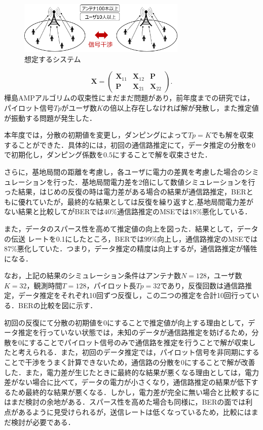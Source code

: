 \documentclass{jarticle}
\begin{document}
\begin{figure}[htbp]
    \begin{center}
     \includegraphics[width=80mm]{./system.png}
    \end{center}
    \caption{想定するシステム}
    \label{fig:system}
\end{figure}

\begin{equation} 
    \label{eq:SendSignal}
	\boldsymbol{X} =  \left(
		\begin{array}{cccc}
			\boldsymbol{X}_{11} &\boldsymbol{X}_{12} &\boldsymbol{P}\\
			\boldsymbol{P} &\boldsymbol{X}_{21} &\boldsymbol{X}_{22}
		\end{array}
	\right).
\end{equation}
樺島AMPアルゴリムの収束性にまだまだ問題があり，前年度までの研究では，パイロット信号$Tp$がユーザ数$K$の倍以上存在しなければ解が発散し，また推定値が振動する問題が発生した．

本年度では，分散の初期値を変更し，ダンピング\cite{vila}によって$Tp=K$でも解を収束することができた．具体的には，初回の通信路推定にて，データ推定の分散を0で初期化し，ダンピング係数を$0.5$にすることで解を収束させた．

さらに，基地局間の距離を考慮し，各ユーザに電力の差異を考慮した場合のシミュレーションを行った．基地局間電力差を2倍にして数値シミュレーションを行った結果，はじめの反復の時は電力差がある場合の結果が通信路推定，BERともに優れていたが，最終的な結果としては反復を繰り返すと,基地局間電力差がない結果と比較してがBERでは$40\%$通信路推定のMSEでは$18\%$悪化している．

また，データのスパース性を高めて推定値の向上を図った．結果として，データの伝送
レートを0.1にしたところ，BERでは$99\%$向上し，通信路推定のMSEでは$87\%$悪化していた．つまり，データ推定の精度は向上するが，通信路推定が犠牲になる．

なお，上記の結果のシミュレーション条件はアンテナ数$N=128$，ユーザ数$K=32$，観測時間$T=128$，パイロット長$Tp=32$であり，反復回数は通信路推定，データ推定をそれぞれ10回ずつ反復し，この二つの推定を合計10回行っている．BERの比較を図に示す．

初回の反復にて分散の初期値を0にすることで推定値が向上する理由として，データ推定を行っていない状態では，未知のデータが通信路推定を妨げるため，分散を0にすることでパイロット信号のみで通信路を推定を行うことで解が収束したと考えられる．また，初回のデータ推定では，パイロット信号を非同期にすることで干渉をうまく計算できないため，通信路の分散を0にすることで解が改善した．また，電力差が生じたときに最終的な結果が悪くなる理由としては，電力差がない場合に比べて，データの電力が小さくなり，通信路推定の結果が低下するため最終的な結果が悪くなる．しかし，電力差が完全に無い場合と比較するにはまだ検討の余地がある．スパース性を高めた場合も同様に，BERの面では利点があるように見受けられるが，送信レートは低くなっているため，比較にはまだ検討が必要である．



\end{document}
